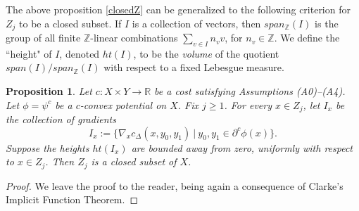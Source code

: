 \documentclass[12pt]{amsart}
\newtheorem{prop}{Proposition}
\newtheorem{cor}{Corollary}
\theoremstyle{definition}
\theoremstyle{remark}
\newcommand{\bR}{\mathbb{R}}
\newcommand{\bZ}{\mathbb{Z}}
\newcommand{\del}{\partial}
\newcommand{\cd}{c_\Delta}
\begin{document}
The above proposition \ref{closedZ} can be generalized to the following criterion for $Z_j$ to be a closed subset. If $I$ is a collection of vectors, then $span_\bZ(I)$ is the group of all finite $\bZ$-linear combinations $\sum_{v\in I} n_v v $, for $n_v\in \bZ$.  We define the ``height" of $I$, denoted $ht(I)$, to be the \emph{volume} of the quotient $span(I)/span_{\bZ}(I)$ with respect to a fixed Lebesgue measure.

\begin{prop}
Let $c:X\times Y \to \bR$ be a cost satisfying Assumptions (A0)--(A4). Let $\phi=\psi^c$ be a $c$-convex potential on $X$. Fix $j\geq 1$. For every $x\in Z_j$, let $I_x$ be the collection of gradients $$I_x:=\{\nabla_x \cd(x,y_0, y_1)~|~y_0, y_1 \in \del^c \phi(x)\}.$$ Suppose the heights $ht(I_x)$ are bounded away from zero, uniformly with respect to $x\in Z_j$. Then $Z_j$ is a closed subset of $X$. 
\end{prop}
\begin{proof}
We leave the proof to the reader, being again a consequence of Clarke's Implicit Function Theorem. 
\end{proof}






























\end{document}
